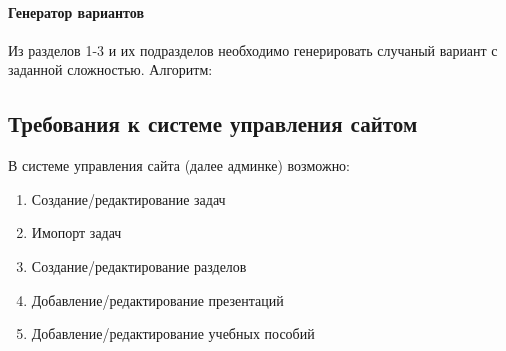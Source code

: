 \paragraph{Генератор вариантов}
Из разделов 1-3 и их подразделов необходимо генерировать случаный вариант с заданной сложностью.
Алгоритм:

\subsection{Требования к системе управления сайтом}
В системе управления сайта (далее админке) возможно:
\begin{enumerate}
  \item Создание/редактирование задач
  \item Имопорт задач
  \item Создание/редактирование разделов
  \item Добавление/редактирование презентаций
  \item Добавление/редактирование учебных пособий
\end{enumerate}
